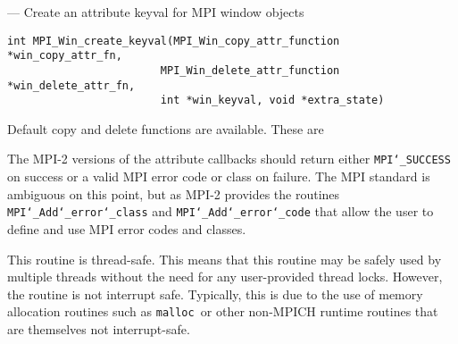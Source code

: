 \startmanpage
{}
--- Create an attribute keyval for MPI window objects 
\startvb\begin{verbatim}
int MPI_Win_create_keyval(MPI_Win_copy_attr_function *win_copy_attr_fn, 
                        MPI_Win_delete_attr_function *win_delete_attr_fn, 
                        int *win_keyval, void *extra_state)

\end{verbatim}
\endvb

\par
{}
\par
{}
Default copy and delete functions are available.  These are
\par
\par
{}
The MPI-2 versions of the attribute callbacks should return either
{\tt MPI{\tt \char`\_}SUCCESS} on success or a valid MPI error code or class on failure.
The MPI standard is ambiguous on this point, but as MPI-2 provides
the routines {\tt MPI{\tt \char`\_}Add{\tt \char`\_}error{\tt \char`\_}class} and {\tt MPI{\tt \char`\_}Add{\tt \char`\_}error{\tt \char`\_}code} that allow the
user to define and use MPI error codes and classes.
\par
{}
\par
This routine is thread-safe.  This means that this routine may be
safely used by multiple threads without the need for any user-provided
thread locks.  However, the routine is not interrupt safe.  Typically,
this is due to the use of memory allocation routines such as {\tt malloc
}or other non-MPICH runtime routines that are themselves not interrupt-safe.
